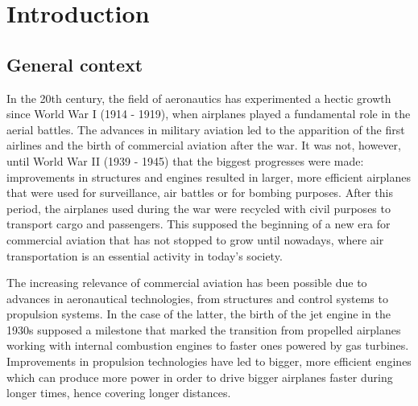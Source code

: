 \chapter{Introduction}
    

\section{General context}





In the 20th century, the field of aeronautics has experimented a hectic growth since World War I (1914 - 1919), when airplanes played a fundamental role in the aerial battles. The advances in military aviation led to the apparition of the first airlines and the birth of commercial aviation after the war. It was not, however, until World War II (1939 - 1945) that the biggest progresses were made: improvements in structures and engines resulted in larger, more efficient airplanes that were used for surveillance, air battles or for bombing purposes. After this period, the airplanes used during the war were recycled with civil purposes to transport cargo and passengers. This supposed the beginning of a new era for commercial aviation that has not stopped to grow until nowadays, where air transportation is an essential activity in today's society.

The increasing relevance of commercial aviation has been possible due to advances in aeronautical technologies, from structures and control systems to propulsion systems. In the case of the latter, the birth of the jet engine in the 1930s supposed a milestone that marked the transition from propelled airplanes working with internal combustion engines to faster ones powered by gas turbines. Improvements in propulsion technologies have led to bigger, more efficient engines which can produce more power in order to drive bigger airplanes faster during longer times, hence covering longer distances. 


